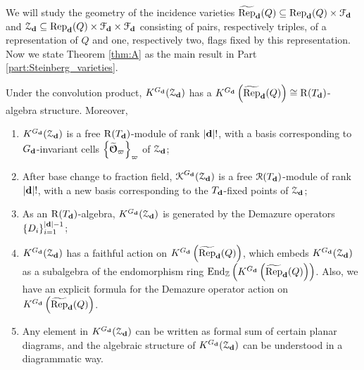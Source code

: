 We will study the geometry of the incidence varieties $\operatorname{\widetilde{\operatorname{Rep}}}_{\mathbf{d}}(Q) \subseteq \operatorname{\operatorname{Rep}}_{\mathbf{d}}(Q) \times \mathcal{F}_{\mathbf{d}}$ and $\operatorname{\mathcal{Z}}_{\mathbf{d}} \subseteq \operatorname{\operatorname{Rep}}_{\mathbf{d}}(Q) \times \mathcal{F}_{\mathbf{d}} \times \mathcal{F}_{\mathbf{d}}$ consisting of pairs, respectively triples, of a representation of $Q$ and one, respectively two, flags fixed by this representation. Now we state Theorem \ref{thm:A} as the main result in Part \ref{part:Steinberg_varieties}.

\begin{theoremA}\label{thm:A}
Under the convolution product, $K^{G_{\mathbf{d}}}(\operatorname{\mathcal{Z}}_{\mathbf{d}})$ has a $K^{G_{\mathbf{d}}}\left(\operatorname{\widetilde{\operatorname{Rep}}}_{\mathbf{d}}(Q)\right) \cong \operatorname{\operatorname{R}}(T_{\mathbf{d}})$-algebra structure. Moreover,
\begingroup
\upshape
{}
\renewcommand\labelenumi{(\theenumi)}
\begin{enumerate}
\item $K^{G_{\mathbf{d}}}(\operatorname{\mathcal{Z}}_{\mathbf{d}})$ is a free $\operatorname{\operatorname{R}}(T_{\mathbf{d}})$-module of rank $|\mathbf{d}|!$, with a basis corresponding to $G_{\mathbf{d}}$-invariant cells $\left\{ \widetilde{\boldsymbol{\mathcal{O}}}_{\varpi} \right\}_{\varpi}$ of $\operatorname{\mathcal{Z}}_{\mathbf{d}}$;\label{item:A1}
\item After base change to fraction field, $\operatorname{\operatorname{\mathcal{K}}}^{G_{\mathbf{d}}}(\operatorname{\mathcal{Z}}_{\mathbf{d}})$ is a free $\operatorname{\operatorname{\mathcal{R}}}(T_{\mathbf{d}})$-module of rank $|\mathbf{d}|!$, with a new basis corresponding to the $T_{\mathbf{d}}$-fixed points of $\operatorname{\mathcal{Z}}_{\mathbf{d}}$;\label{item:A2}
\item As an $\operatorname{\operatorname{R}}(T_{\mathbf{d}})$-algebra, $K^{G_{\mathbf{d}}}(\operatorname{\mathcal{Z}}_{\mathbf{d}})$ is generated by the Demazure operators $\{D_i\}_{i=1}^{|\mathbf{d}|-1}$;\label{item:A3}
\item $K^{G_{\mathbf{d}}}(\operatorname{\mathcal{Z}}_{\mathbf{d}})$ has a faithful action on $K^{G_{\mathbf{d}}}\left(\operatorname{\widetilde{\operatorname{Rep}}}_{\mathbf{d}}(Q)\right)$, which embeds $K^{G_{\mathbf{d}}}(\operatorname{\mathcal{Z}}_{\mathbf{d}})$ as a subalgebra of the endomorphism ring $\operatorname{\operatorname{End}}_{\mathbb{Z}}\label{item:A4} \left(K^{G_{\mathbf{d}}}\left(\operatorname{\widetilde{\operatorname{Rep}}}_{\mathbf{d}}(Q)\right)\right)$. Also, we have an explicit formula for the Demazure operator action on $K^{G_{\mathbf{d}}}\left(\operatorname{\widetilde{\operatorname{Rep}}}_{\mathbf{d}}(Q)\right)$.
\item Any element in $K^{G_{\mathbf{d}}}(\operatorname{\mathcal{Z}}_{\mathbf{d}})$ can be written as formal sum of certain planar diagrams, and the algebraic structure of $K^{G_{\mathbf{d}}}(\operatorname{\mathcal{Z}}_{\mathbf{d}})$ can be understood in a diagrammatic way.\label{item:A5}
\end{enumerate} 
\endgroup
\end{theoremA}

